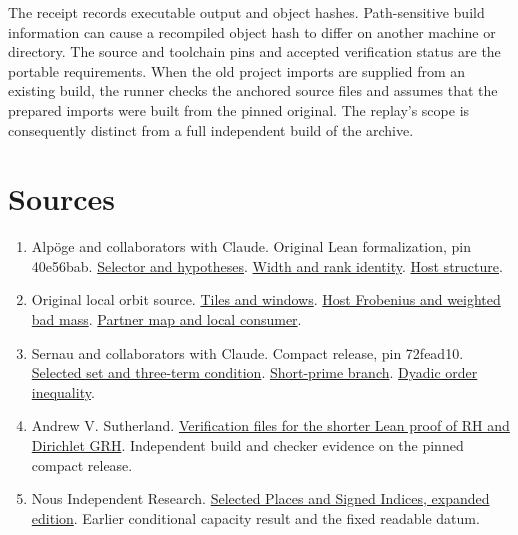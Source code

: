 \documentclass[12pt,letterpaper]{article}
\DeclareRobustCommand{\id}[1]{\mbox{\small\ttfamily #1}}
\newcommand{\old}[3]{\href{https://github.com/nousentllc/riemann-hypothesis/blob/40e56bab026552e089d7afcfeff08d2defb9c005/src/#1\#L#2}{#3}}
\newcommand{\newsrc}[3]{\href{https://github.com/lsernau/grh-lean/blob/72fead102f663d5c7a407964a13dc0cf9d977207/grh-compact/src/#1\#L#2}{#3}}
\begin{document}
The receipt records executable output and object hashes. Path-sensitive build information can cause a recompiled object hash to differ on another machine or directory. The source and toolchain pins and accepted verification status are the portable requirements. When the old project imports are supplied from an existing build, the runner checks the anchored source files and assumes that the prepared imports were built from the pinned original. The replay's scope is consequently distinct from a full independent build of the archive.

\section{Sources}

\begin{enumerate}[leftmargin=*]
\item Alp\"oge and collaborators with Claude. Original Lean formalization, pin \id{40e56bab}. \old{Development/AutomorphicArithmetic/ThickFrames/topsChoiceH.lean}{30}{Selector and hypotheses}. \old{Development/AbelianVarietyTheory/Definitions/GlobalTwisting/PairRowIffQdRows.lean}{17}{Width and rank identity}. \old{Formalism/LocalRingCardinality/DataHost.lean}{39}{Host structure}.
\item Original local orbit source. \old{Formalism/SubspaceCounting/GoodOrbitIntervalTileCondition.lean}{9}{Tiles and windows}. \old{Development/AbelianVarietyTheory/Definitions/GlobalTwisting/ThinScalesIffHostBound.lean}{19}{Host Frobenius and weighted bad mass}. \old{Formalism/LocalToGlobal/GlobalTheory/IsResidueClassZero.lean}{77}{Partner map and local consumer}.
\item Sernau and collaborators with Claude. Compact release, pin \id{72fead10}. \newsrc{New/Data/AdmissibleData.lean}{35}{Selected set and three-term condition}. \newsrc{New/Curve/DepthPairs.lean}{59}{Short-prime branch}. \newsrc{Lib/General/NumberTheory/QuadFieldSplitting.lean}{83}{Dyadic order inequality}.
\item Andrew V. Sutherland. \href{https://math.mit.edu/~drew/shortgrh/}{Verification files for the shorter Lean proof of RH and Dirichlet GRH}. Independent build and checker evidence on the pinned compact release.
\item Nous Independent Research. \href{https://github.com/nousentllc/riemann-hypothesis/tree/43141b319692e076cd6f6132534a3bec9f86fa39/research/uriel/experiments/selected-place-transport-expanded}{Selected Places and Signed Indices, expanded edition}. Earlier conditional capacity result and the fixed readable datum.
\end{enumerate}
\end{document}
